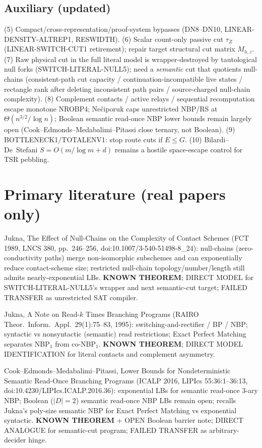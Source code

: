 \documentclass[11pt]{article}
\begin{document}
\subsection*{Auxiliary (updated)}
(5) Compact/cross-representation/proof-system bypasses (DN8--DN10, LINEAR-DENSITY-ALTREP1, RESWIDTH).
(6) Scalar count-only passive cut $\tau_Z$ (LINEAR-SWITCH-CUT1 retirement); repair target
structural cut matrix $M_{h,z}$.
(7) Raw physical cut in the full literal model is wrapper-destroyed by tautological
null forks (SWITCH-LITERAL-NULL5); need a \emph{semantic} cut that quotients null-chains
(consistent-path cut capacity / continuation-incompatible live states / rectangle rank
after deleting inconsistent path pairs / source-charged null-chain complexity).
(8) Complement contacts / active relays / sequential recomputation escape monotone NROBP4;
Ne\v{c}iporuk caps unrestricted NBP/RS at $\Theta(n^{3/2}/\log n)$; Boolean semantic
read-once NBP lower bounds remain largely open (Cook--Edmonds--Medabalimi--Pitassi
close ternary, not Boolean).
(9) BOTTLENECK1/TOTALENV1: stop route cuts if $E\le G$.
(10) Bilardi--De~Stefani $S=O(m/\log m+d)$ remains a hostile space-escape control for TSR pebbling.

\section*{Primary literature (real papers only)}
Jukna, The Effect of Null-Chains on the Complexity of Contact Schemes
(FCT 1989, LNCS 380, pp.~246--256, doi:10.1007/3-540-51498-8\_24):
null-chains (zero-conductivity paths) merge non-isomorphic subschemes and can
exponentially reduce contact-scheme size; restricted null-chain topology/number/length
still admits nearly-exponential LBs. \textbf{KNOWN THEOREM}; DIRECT MODEL for
SWITCH-LITERAL-NULL5's wrapper and next semantic-cut target; FAILED TRANSFER as
unrestricted SAT compiler.

Jukna, A Note on Read-$k$ Times Branching Programs
(RAIRO Theor.\ Inform.\ Appl.\ 29(1):75--83, 1995):
switching-and-rectifier / BP / NBP; syntactic vs nonsyntactic (semantic) read restrictions;
Exact Perfect Matching separates NBP$_1$ from co-NBP$_1$. \textbf{KNOWN THEOREM};
DIRECT MODEL IDENTIFICATION for literal contacts and complement asymmetry.

Cook--Edmonds--Medabalimi--Pitassi, Lower Bounds for Nondeterministic Semantic
Read-Once Branching Programs (ICALP 2016, LIPIcs 55:36:1--36:13,
doi:10.4230/LIPIcs.ICALP.2016.36): exponential LBs for semantic read-once 3-ary NBP;
Boolean ($|D|=2$) semantic read-once NBP LBs remain open; recalls Jukna's poly-size
semantic NBP for Exact Perfect Matching vs exponential syntactic. \textbf{KNOWN THEOREM}
+ OPEN Boolean barrier note; DIRECT ANALOGUE for semantic-cut program; FAILED TRANSFER
as arbitrary-decider hinge.
\end{document}
